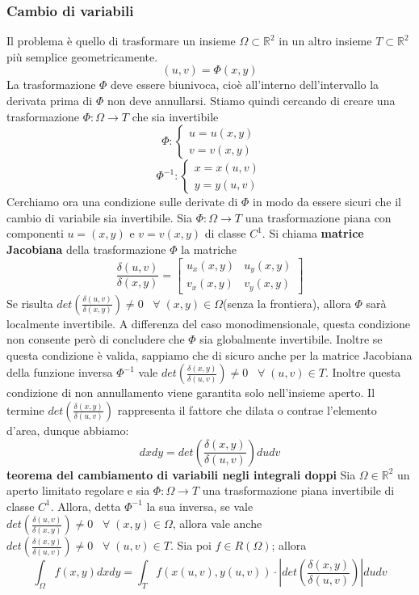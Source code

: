\subsubsection{Cambio di variabili}
Il problema è quello di trasformare un insieme $\Omega \subset \mathbb{R}^2$ in un altro insieme $T \subset \mathbb{R}^2$ più semplice geometricamente.
\[
    (u,v) = \Phi(x,y)   
\] 
La trasformazione $\Phi$ deve essere biunivoca, cioè all'interno dell'intervallo la derivata prima di $\Phi$ non deve annullarsi.\newline
Stiamo quindi cercando di creare una trasformazione $\Phi: \Omega \rightarrow T$ che sia invertibile
\[
    \Phi : \begin{cases}
        u = u(x,y)\\
        v = v(x,y)
    \end{cases}
\]
\[
    \Phi^{-1} : \begin{cases}
        x = x(u,v)\\
        y = y(u,v)
    \end{cases}
\]
Cerchiamo ora una condizione sulle derivate di $\Phi$ in modo da essere sicuri che il cambio di variabile sia invertibile.\newline
\newline
Sia $\Phi : \Omega \rightarrow  T$ una trasformazione piana con componenti $u = (x,y)$ e $v = v(x,y)$ di classe $C^1$. Si chiama \textbf{matrice Jacobiana} della trasformazione $\Phi$ la matriche
\[
    \frac{\delta(u,v)}{\delta(x,y)} = \left[\begin{matrix}
        u_x(x,y) & u_y(x,y)\\
        v_x(x,y) & v_y(x,y)
    \end{matrix}\right]
\]
Se risulta $det\left(\frac{\delta(u,v)}{\delta(x,y)}\right) \neq 0 \;\; \;\forall\;(x,y) \in \Omega$(senza la frontiera), allora $\Phi$ sarà localmente invertibile. A differenza del caso monodimensionale, questa condizione non consente però di concludere che $\Phi$ sia globalmente invertibile. Inoltre se questa condizione è valida, sappiamo che di sicuro anche per la matrice Jacobiana della funzione inversa $\Phi^{-1}$ vale $det\left(\frac{\delta(x,y)}{\delta(u,v)}\right) \neq 0 \;\; \;\forall\;(u,v) \in T$. Inoltre questa condizione di non annullamento viene garantita solo nell'insieme aperto.\newline
\newline
Il termine $det\left(\frac{\delta(x,y)}{\delta(u,v)}\right)$ rappresenta il fattore che dilata o contrae l'elemento d'area, dunque abbiamo:
\[
    dxdy = det\left(\frac{\delta(x,y)}{\delta(u,v)}\right)dudv
\]
\textbf{teorema del cambiamento di variabili negli integrali doppi}\newline
Sia $\Omega \in \mathbb{R}^2$ un aperto limitato regolare e sia $\Phi : \Omega \rightarrow T$ una trasformazione piana invertibile di classe $C^1$. Allora, detta $\Phi^{-1}$ la sua inversa, se vale $det\left(\frac{\delta(u,v)}{\delta(x,y)}\right) \neq 0 \;\; \;\forall\;(x,y) \in \Omega$, allora vale anche $det\left(\frac{\delta(x,y)}{\delta(u,v)}\right) \neq 0 \;\; \;\forall\;(u,v) \in T$. Sia poi $f \in R(\Omega)$; allora
\[
    \int_\Omega f(x,y) dx dy = \int_T f(x(u,v), y(u,v)) \cdot \left|det\left(\frac{\delta(x,y)}{\delta(u,v)}\right)\right| du dv
\]
